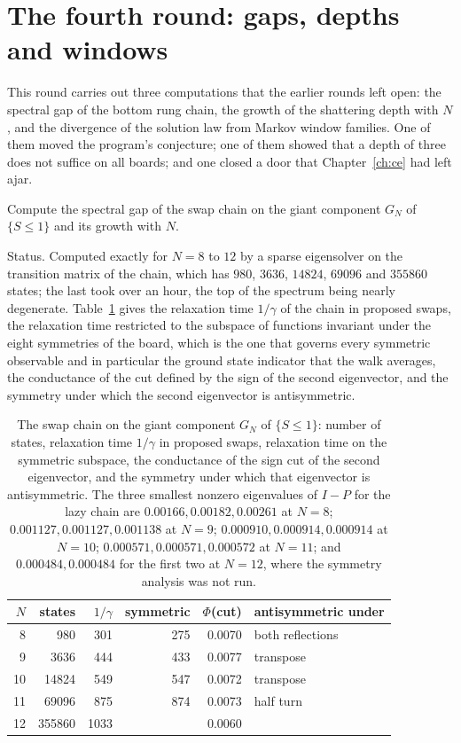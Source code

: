 \section{The fourth round: gaps, depths and windows}
\label{sec:round4}

This round carries out three computations that the earlier rounds left open: the spectral gap of the bottom rung chain, the growth of the shattering depth with $N$, and the divergence of the solution law from Markov window families. One of them moved the program's conjecture; one of them showed that a depth of three does not suffice on all boards; and one closed a door that Chapter~\ref{ch:ce} had left ajar.

\begin{problem}
Compute the spectral gap of the swap chain on the giant component $G_N$ of $\{ S \le 1 \}$ and its growth with $N$.
\end{problem}

Status. Computed exactly for $N = 8$ to $12$ by a sparse eigensolver on the transition matrix of the chain, which has $980$, $3636$, $14824$, $69096$ and $355860$ states; the last took over an hour, the top of the spectrum being nearly degenerate. Table~\ref{tab:gap} gives the relaxation time $1 / \gamma$ of the chain in proposed swaps, the relaxation time restricted to the subspace of functions invariant under the eight symmetries of the board, which is the one that governs every symmetric observable and in particular the ground state indicator that the walk averages, the conductance of the cut defined by the sign of the second eigenvector, and the symmetry under which the second eigenvector is antisymmetric.

\begin{table}[t]
\centering
\small
\caption{The swap chain on the giant component $G_N$ of $\{ S \le 1 \}$: number of states, relaxation time $1/\gamma$ in proposed swaps, relaxation time on the symmetric subspace, the conductance of the sign cut of the second eigenvector, and the symmetry under which that eigenvector is antisymmetric. The three smallest nonzero eigenvalues of $I - P$ for the lazy chain are $0.00166, 0.00182, 0.00261$ at $N = 8$; $0.001127, 0.001127, 0.001138$ at $N = 9$; $0.000910, 0.000914, 0.000914$ at $N = 10$; $0.000571, 0.000571, 0.000572$ at $N = 11$; and $0.000484, 0.000484$ for the first two at $N = 12$, where the symmetry analysis was not run.}
\label{tab:gap}
\begin{tabular}{rrrrrl}
\toprule
$N$ & states & $1/\gamma$ & symmetric & $\Phi$(cut) & antisymmetric under \\
\midrule
8 & 980 & 301 & 275 & 0.0070 & both reflections \\
9 & 3636 & 444 & 433 & 0.0077 & transpose \\
10 & 14824 & 549 & 547 & 0.0072 & transpose \\
11 & 69096 & 875 & 874 & 0.0073 & half turn \\
12 & 355860 & 1033 & & 0.0060 & \\
\bottomrule
\end{tabular}
\end{table}

